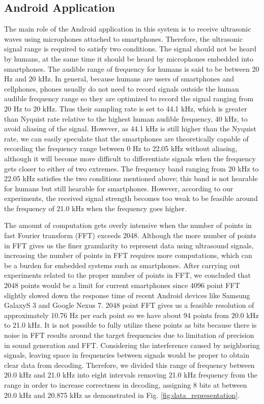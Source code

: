 \subsection{Android Application}
\label{sec:android-application}

The main role of the Android application in this system is to receive ultrasonic waves using microphones attached to smartphones. Therefore, the ultrasonic signal range is required to satisfy two conditions. The signal should not be heard by humans, at the same time it should be heard by microphones embedded into smartphones. The audible range of frequency for humans is said to be between 20 Hz and 20 kHz. In general, because humans are users of smartphones and cellphones, phones usually do not need to record signals outside the human audible frequency range so they are optimized to record the signal ranging from 20 Hz to 20 kHz. Thus their sampling rate is set to 44.1 kHz, which is greater than Nyquist rate relative to the highest human audible frequency, 40 kHz, to avoid aliasing of the signal. However, as 44.1 kHz is still higher than the Nyquist rate, we can easily speculate that the smartphones are theoretically capable of recording the frequency range between 0 Hz to 22.05 kHz without aliasing, although it will become more difficult to differentiate signals when the frequency gets closer to either of two extremes. The frequency band ranging from 20 kHz to 22.05 kHz satisfies the two conditions mentioned above; this band is not hearable for humans but still hearable for smartphones. However, according to our experiments, the received signal strength becomes too weak to be feasible around the frequency of 21.0 kHz when the frequency goes higher.

The amount of computation gets overly intensive when the number of points in fast Fourier transform (FFT) exceeds 2048. Although the more number of points in FFT gives us the finer granularity to represent data using ultrasound signals, increasing the number of points in FFT requires more computations, which can be a burden for embedded systems such as smartphones. After carrying out experiments related to the proper number of points in FFT, we concluded that 2048 points would be a limit for current smartphones since 4096 point FFT slightly slowed down the response time of recent Android devices like Samsung GalaxyS 3 and Google Nexus 7. 2048 point FFT gives us a feasible resolution of approximately 10.76 Hz per each point so we have about 94 points from 20.0 kHz to 21.0 kHz. It is not possible to fully utilize these points as bits because there is noise in FFT results around the target frequencies due to limitation of precision in sound generation and FFT. Considering the interference caused by neighboring signals, leaving space in frequencies between signals would be proper to obtain clear data from decoding. Therefore, we divided this range of frequency between 20.0 kHz and 21.0 kHz into eight intervals removing 21.0 kHz frequency from the range in order to increase correctness in decoding, assigning 8 bits at between 20.0 kHz and 20.875 kHz as demonstrated in Fig. \ref{fig:data_representation}.

